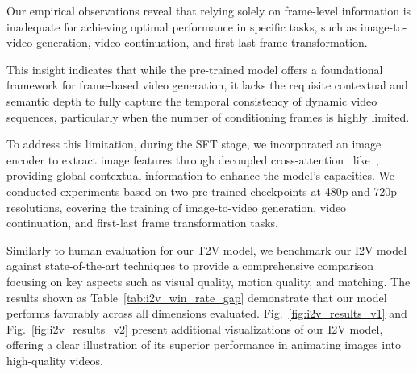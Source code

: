 Our empirical observations reveal that relying solely on frame-level information is inadequate for achieving optimal performance in specific tasks, such as image-to-video generation, video continuation, and first-last frame transformation.

This insight indicates that while the pre-trained model offers a foundational framework for frame-based video generation, it lacks the requisite contextual and semantic depth to fully capture the temporal consistency of dynamic video sequences, particularly when the number of conditioning frames is highly limited.

To address this limitation, during the SFT stage, we incorporated an image encoder to extract image features through decoupled cross-attention~\citep{ye2023ip} like~\citep{i2vadapter}, providing global contextual information to enhance the model's capacities.
%
We conducted experiments based on two pre-trained checkpoints at 480p and 720p resolutions, covering the training of image-to-video generation, video continuation, and first-last frame transformation tasks.

Similarly to human evaluation for our T2V model, we benchmark our I2V model against state-of-the-art techniques to provide a comprehensive comparison focusing on key aspects such as visual quality, motion quality, and matching. The results shown as Table~\ref{tab:i2v_win_rate_gap} demonstrate that our model performs favorably across all  dimensions evaluated. Fig.~\ref{fig:i2v_results_v1} and Fig.~\ref{fig:i2v_results_v2} present additional visualizations of our I2V model, offering a clear illustration of its superior performance in animating images into high-quality videos.


